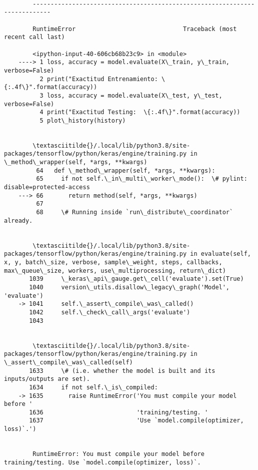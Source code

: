 \documentclass[11pt]{article}
\begin{document}
    \begin{Verbatim}[commandchars=\\\{\}]

        ---------------------------------------------------------------------------

        RuntimeError                              Traceback (most recent call last)

        <ipython-input-40-606cb68b23c9> in <module>
    ----> 1 loss, accuracy = model.evaluate(X\_train, y\_train, verbose=False)
          2 print("Exactitud Entrenamiento: \{:.4f\}".format(accuracy))
          3 loss, accuracy = model.evaluate(X\_test, y\_test, verbose=False)
          4 print("Exactitud Testing:  \{:.4f\}".format(accuracy))
          5 plot\_history(history)


        \textasciitilde{}/.local/lib/python3.8/site-packages/tensorflow/python/keras/engine/training.py in \_method\_wrapper(self, *args, **kwargs)
         64   def \_method\_wrapper(self, *args, **kwargs):
         65     if not self.\_in\_multi\_worker\_mode():  \# pylint: disable=protected-access
    ---> 66       return method(self, *args, **kwargs)
         67 
         68     \# Running inside `run\_distribute\_coordinator` already.


        \textasciitilde{}/.local/lib/python3.8/site-packages/tensorflow/python/keras/engine/training.py in evaluate(self, x, y, batch\_size, verbose, sample\_weight, steps, callbacks, max\_queue\_size, workers, use\_multiprocessing, return\_dict)
       1039     \_keras\_api\_gauge.get\_cell('evaluate').set(True)
       1040     version\_utils.disallow\_legacy\_graph('Model', 'evaluate')
    -> 1041     self.\_assert\_compile\_was\_called()
       1042     self.\_check\_call\_args('evaluate')
       1043 


        \textasciitilde{}/.local/lib/python3.8/site-packages/tensorflow/python/keras/engine/training.py in \_assert\_compile\_was\_called(self)
       1633     \# (i.e. whether the model is built and its inputs/outputs are set).
       1634     if not self.\_is\_compiled:
    -> 1635       raise RuntimeError('You must compile your model before '
       1636                          'training/testing. '
       1637                          'Use `model.compile(optimizer, loss)`.')


        RuntimeError: You must compile your model before training/testing. Use `model.compile(optimizer, loss)`.

    \end{Verbatim}
\end{document}
